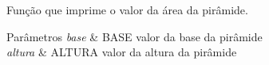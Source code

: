 Função que imprime o valor da área da pirâmide. 


\begin{DoxyParams}{Parâmetros}
{\em base} & B\+A\+SE valor da base da pirâmide \\
\hline
{\em altura} & A\+L\+T\+U\+RA valor da altura da pirâmide \\
\hline
\end{DoxyParams}
